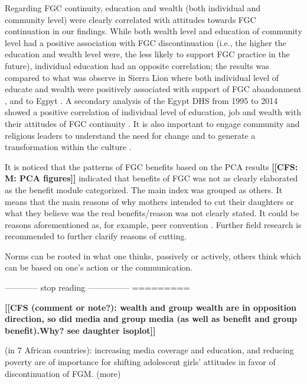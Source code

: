 \documentclass[12pt,]{article}
\newcommand{\comment}[1]{\textbf{[[#1]]}}
\newcommand{\cfcmt}[1]{\comment{CFS: #1}}
\newcommand{\cf}[1]{\comment{CFS (comment or note?): #1}}
\begin{document}
Regarding FGC continuity, education and wealth (both individual and community level) were clearly correlated with attitudes towards FGC continuation in our findings.  While both wealth level and education of community level had a positive association with FGC discontinuation (i.e., the higher the education and wealth level were, the less likely to support FGC practice in the future), individual education had an opposite correlation; the results was compared to what was observe in Sierra Lion where both individual level of educate and wealth were positively associated with support of FGC abandonment \cite{Sagn14}, and to Egpyt \cite{DalaLawo10, VanMeek16}. A secondary analysis of the Egypt DHS from 1995 to 2014 showed a positive correlation of individual level of education, job and wealth with their attitudes of FGC continuity \cite{VanMeek15} .  It is also important to engage community and religious leaders to understand the need for change and to generate a transformation within the culture \cite{KleiHelz18}.

It is noticed that the patterns of FGC benefits based on the PCA results \cfcmt{M: PCA figures} indicated that benefits of FGC was not as clearly elaborated as the benefit module categorized.  The main index was grouped as others.  It means that the main reasons of why mothers intended to cut their daughters or what they believe was the real benefits/reason was not clearly stated. It could be reasons aforementioned as, for example, peer convention \cite{GrosHayd19CONFIRM, ShelWand11}.  Further field research is recommended to further clarify reasons of cutting.

Norms can be rooted in what one thinks, passively or actively, others think which can be based on one's action or the communication.

———— stop reading —————
=========






\cf{wealth and group wealth are in opposition direction, so did media and group media (as well as benefit and group benefit).Why?  see daughter isoplot}



\cite{DalaKalm18}(in 7 African countries): increasing media coverage and education, and reducing poverty are of importance for shifting adolescent girls' attitudes in favor of discontinuation of FGM.
\cite{Hayf05, PashPonn16} (more) %
\end{document}
